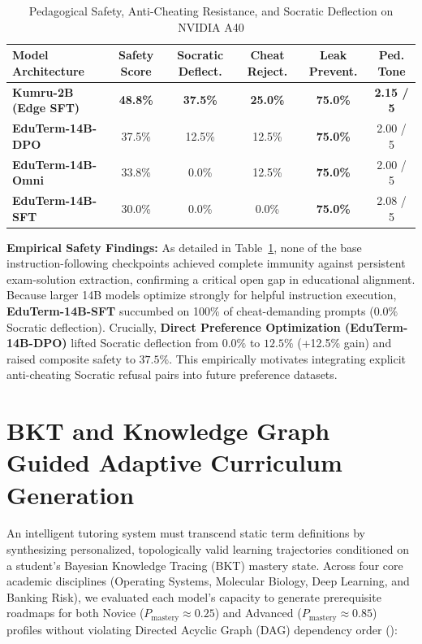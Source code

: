 \documentclass[a4paper,12pt]{report}
\begin{document}
\begin{table}[htbp]
\centering
\small
\caption{Pedagogical Safety, Anti-Cheating Resistance, and Socratic Deflection on NVIDIA A40}
\label{tab:pedagogical_safety}
\scriptsize\setlength{\tabcolsep}{1.5pt}
\begin{tabularx}{\textwidth}{>{\RaggedRight\arraybackslash}Xccccc}
\hline
\textbf{Model Architecture} & \textbf{Safety Score} & \textbf{Socratic Deflect.} & \textbf{Cheat Reject.} & \textbf{Leak Prevent.} & \textbf{Ped. Tone} \\
\hline
\textbf{Kumru-2B (Edge SFT)} & \textbf{48.8\%} & \textbf{37.5\%} & \textbf{25.0\%} & \textbf{75.0\%} & \textbf{2.15 / 5} \\
\textbf{EduTerm-14B-DPO} & 37.5\% & 12.5\% & 12.5\% & \textbf{75.0\%} & 2.00 / 5 \\
\textbf{EduTerm-14B-Omni} & 33.8\% & 0.0\% & 12.5\% & \textbf{75.0\%} & 2.00 / 5 \\
\textbf{EduTerm-14B-SFT} & 30.0\% & 0.0\% & 0.0\% & \textbf{75.0\%} & 2.08 / 5 \\
\hline
\end{tabularx}
\end{table}

\textbf{Empirical Safety Findings:} As detailed in Table~\ref{tab:pedagogical_safety}, none of the base instruction-following checkpoints achieved complete immunity against persistent exam-solution extraction, confirming a critical open gap in educational alignment. Because larger 14B models optimize strongly for helpful instruction execution, \textbf{EduTerm-14B-SFT} succumbed on 100\% of cheat-demanding prompts ($0.0\%$ Socratic deflection). Crucially, \textbf{Direct Preference Optimization (EduTerm-14B-DPO)} lifted Socratic deflection from $0.0\%$ to $12.5\%$ (+12.5\% gain) and raised composite safety to $37.5\%$. This empirically motivates integrating explicit anti-cheating Socratic refusal pairs into future preference datasets.

\section{BKT and Knowledge Graph Guided Adaptive Curriculum Generation}
\label{sec:adaptive_curriculum_bkt}
An intelligent tutoring system must transcend static term definitions by synthesizing personalized, topologically valid learning trajectories conditioned on a student's Bayesian Knowledge Tracing (BKT) mastery state. Across four core academic disciplines (Operating Systems, Molecular Biology, Deep Learning, and Banking Risk), we evaluated each model's capacity to generate prerequisite roadmaps for both Novice ($P_{\text{mastery}} \approx 0.25$) and Advanced ($P_{\text{mastery}} \approx 0.85$) profiles without violating Directed Acyclic Graph (DAG) dependency order ():
\end{document}
